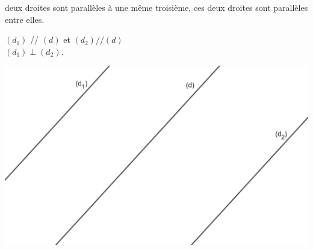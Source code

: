 \begin{myprop}
	 deux droites sont parallèles à une même troisième,  ces deux droites sont parallèles entre elles.
\end{myprop}

\begin{myex}
	\begin{multicols}{2}
		 $(d_1)$ // $(d)$ et $(d_2) // (d)$\\
		 $(d_1) \perp (d_2)$.
		
		\includegraphics[scale=0.1]{img/para3}
	\end{multicols}
	
\end{myex}
